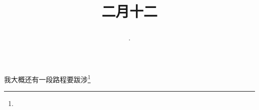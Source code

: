 \title{\date[d=21,m=3,y=2024][year:cn-y,年,month:cn,day:cn,日,·,weekday]·二月十二 }
我大概还有一段路程要跋涉\footnote{ }

